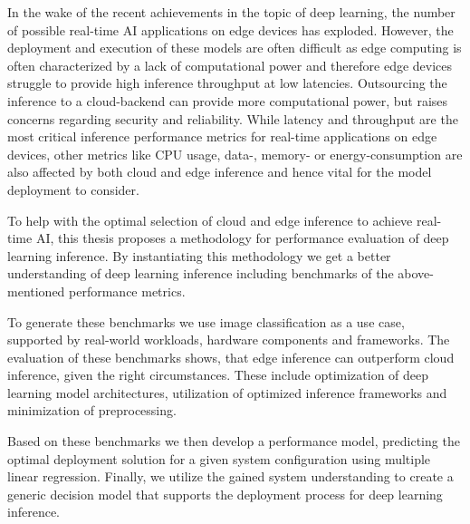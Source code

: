 \noindent In the wake of the recent achievements in the topic of deep learning, the number of possible real-time AI applications on edge devices has exploded.
However, the deployment and execution of these models are often difficult as edge computing is often characterized by a lack of computational power and therefore edge devices struggle to provide high inference throughput at low latencies.
Outsourcing the inference to a cloud-backend can provide more computational power, but raises concerns regarding security and reliability. 
While latency and throughput are the most critical inference performance metrics for real-time applications on edge devices, other metrics like CPU usage, data-, memory- or energy-consumption are also affected by both cloud and edge inference and hence vital for the model deployment to consider.

To help with the optimal selection of cloud and edge inference to achieve real-time AI, this thesis proposes a methodology for performance evaluation of deep learning inference.
By instantiating this methodology we get a better understanding of deep learning inference including benchmarks of the above-mentioned performance metrics.

To generate these benchmarks we use image classification as a use case, supported by real-world workloads, hardware components and frameworks.
The evaluation of these benchmarks shows, that edge inference can outperform cloud inference, given the right circumstances.
These include optimization of deep learning model architectures, utilization of optimized inference frameworks and minimization of preprocessing.


Based on these benchmarks we then develop a performance model, predicting the optimal deployment solution for a given system configuration using multiple linear regression.
Finally, we utilize the gained system understanding to create a generic decision model that supports the deployment process for deep learning inference.




